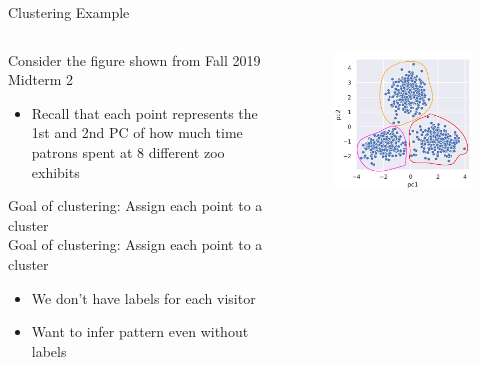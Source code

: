 \documentclass[aspectratio=169]{../latex_main/tntbeamer}  %
\begin{document}
	\begin{frame}{Clustering Example}
	    \begin{columns}
	    

	        \begin{column}{.5\textwidth}
	               Consider the figure shown from Fall 2019 Midterm 2
	               \begin{itemize}
	                   \item Recall that each point represents the 1st and 2nd PC of how much time patrons spent at 8 different zoo exhibits
	               \end{itemize}
	                   Goal of clustering: Assign each point to a cluster\\
	                   \bigskip
	                   Goal of clustering: Assign each point to a cluster
	                   \begin{itemize}
	                       \item We don’t have labels for each visitor
	                       \item Want to infer pattern even without labels
	                   \end{itemize}


	        \end{column}
	        
	        
	        \begin{column}{.5\textwidth}
	                 \begin{figure}
	                    \centering
	                    \includegraphics[scale=.4]{Bild4}
	                \end{figure}
	        \end{column}
	    \end{columns}
	\end{frame}
	
\end{document}
